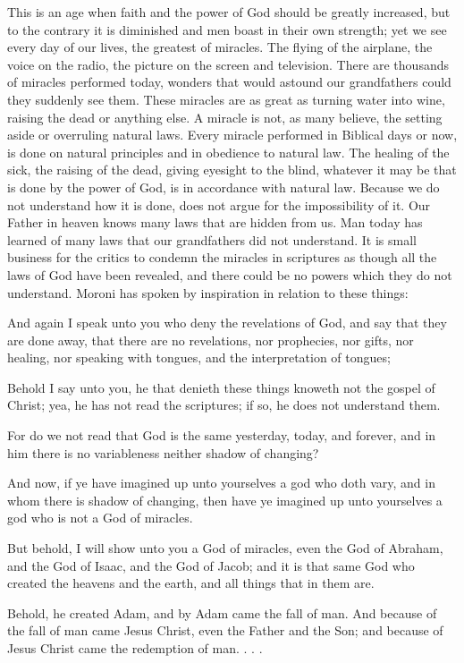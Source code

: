 This is an age when faith and the power of God should be greatly increased, but to the
contrary it is diminished and men boast in their own strength; yet we see every day of our
lives, the greatest of miracles. The flying of the airplane, the voice on the radio, the picture
on the screen and television. There are thousands of miracles performed today, wonders that
would astound our grandfathers could they suddenly see them. These miracles are as great as
turning water into wine, raising the dead or anything else. A miracle is not, as many believe,
the setting aside or overruling natural laws. Every miracle performed in Biblical days or now,
is done on natural principles and in obedience to natural law. The healing of the sick, the
raising of the dead, giving eyesight to the blind, whatever it may be that is done by the power
of God, is in accordance with natural law. Because we do not understand how it is done, does
not argue for the impossibility of it. Our Father in heaven knows many laws that are hidden
from us. Man today has learned of many laws that our grandfathers did not understand. It is
small business for the critics to condemn the miracles in scriptures as though all the laws of
God have been revealed, and there could be no powers which they do not understand. Moroni
has spoken by inspiration in relation to these things:

And again I speak unto you who deny the revelations of God, and say that they are done
away, that there are no revelations, nor prophecies, nor gifts, nor healing, nor speaking with
tongues, and the interpretation of tongues;

Behold I say unto you, he that denieth these things knoweth not the gospel of Christ; yea, he
has not read the scriptures; if so, he does not understand them.

For do we not read that God is the same yesterday, today, and forever, and in him there is no
variableness neither shadow of changing?

And now, if ye have imagined up unto yourselves a god who doth vary, and in whom there is
shadow of changing, then have ye imagined up unto yourselves a god who is not a God of
miracles.

But behold, I will show unto you a God of miracles, even the God of Abraham, and the God
of Isaac, and the God of Jacob; and it is that same God who created the heavens and the
earth, and all things that in them are.

Behold, he created Adam, and by Adam came the fall of man. And because of the fall of man
came Jesus Christ, even the Father and the Son; and because of Jesus Christ came the
redemption of man. . . .

